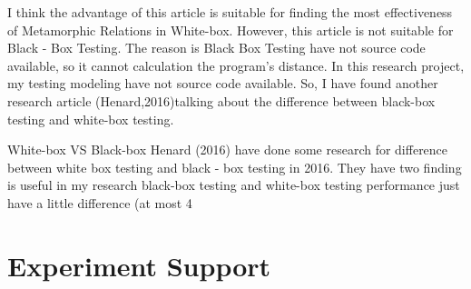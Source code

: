 \documentclass[conference]{IEEEtran}
\begin{document}
 I think the advantage of this article is suitable for finding the most
 effectiveness of Metamorphic Relations in White-box.
 However, this article is not suitable for Black - Box Testing.
 The reason is Black Box Testing have not source code available, so it cannot calculation the program’s distance. In this research project, my testing modeling have not source code available. So, I have found another research article (Henard,2016)talking about the difference between black-box testing and white-box testing.

White-box VS Black-box
Henard (2016) have done some research for difference between white box testing and black - box testing in 2016. They have two finding is useful in my research black-box testing and white-box testing performance just have a little difference (at most 4%

\section{Experiment Support}
\label{sec:label}
\end{document}
